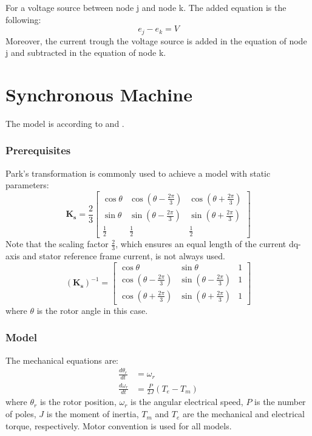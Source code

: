 For a voltage source between node j and node k. The added equation is the following:
\begin{equation}
e_j - e_k = V
\end{equation}
Moreover, the current trough the voltage source is added in the equation of node j and subtracted in the equation of node k.




\section{Synchronous Machine}

The model is according to \cite{wang2010methods} and \cite{kundur1994power}. 

\subsubsection{Prerequisites}
Park's transformation is commonly used to achieve a model with static parameters:
%
\begin{equation}
\mathbf{K_s} = \frac{2}{3}
 \begin{bmatrix} 
  \cos \theta & \cos(\theta-\frac{2\pi}{3}) & \cos(\theta+\frac{2\pi}{3}) \\
  \sin \theta & \sin(\theta-\frac{2\pi}{3}) & \sin(\theta+\frac{2\pi}{3}) \\
  \frac{1}{2} & \frac{1}{2} & \frac{1}{2}
 \end{bmatrix}
\end{equation}
%
Note that the scaling factor $\frac{2}{3}$, which ensures an equal length of the current dq-axis and stator reference frame current, is not always used. 
%
\begin{equation}
(\mathbf{K_s})^{-1} = 
 \begin{bmatrix} 
  \cos \theta & \sin \theta & 1 \\
  \cos(\theta-\frac{2\pi}{3}) & \sin(\theta-\frac{2\pi}{3}) & 1 \\
  \cos(\theta+\frac{2\pi}{3}) & \sin(\theta+\frac{2\pi}{3}) & 1
 \end{bmatrix}
\end{equation}
%
where $\theta$ is the rotor angle in this case.

\subsubsection{Model}

The mechanical equations are:
%
\begin{align}
\frac{d\theta_r}{dt} &= \omega_r \label{eq:d_theta} \\
\frac{d\omega_r}{dt} &= \frac{P}{2J} (T_e-T_m) \label{eq:d_omega}
\end{align}
%
where $\theta_r$ is the rotor position, $\omega_r$ is the angular electrical speed, $P$ is the number of poles, $J$ is the moment of inertia, $T_m$ and $T_e$ are the mechanical and electrical torque, respectively. Motor convention is used for all models. 


